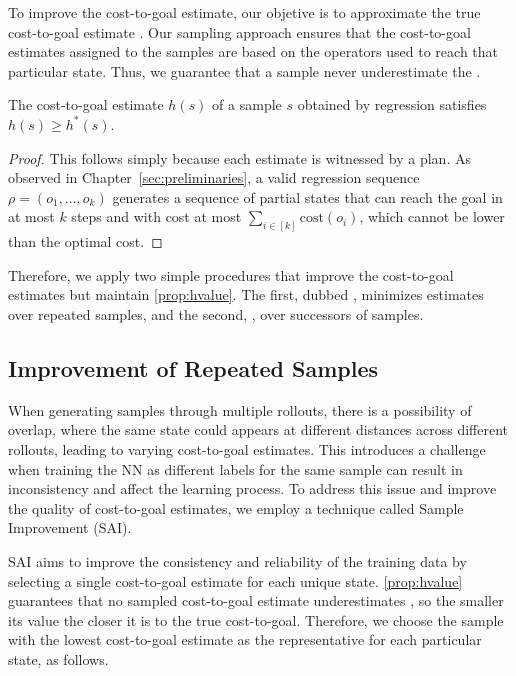 To improve the cost-to-goal estimate, our objetive is to approximate the true cost-to-goal estimate \hstar. Our sampling approach ensures that the cost-to-goal estimates assigned to the samples are based on the operators used to reach that particular state. Thus, we guarantee that a sample never underestimate the \hstar.

\begin{property}
    \label{prop:hvalue}
    The cost-to-goal estimate $h(s)$ of a sample $s$ obtained by regression satisfies $h(s)\geq h^*(s)$.
\end{property}
\begin{proof}
    This follows simply because each estimate is witnessed by a plan. As observed in Chapter~\ref{sec:preliminaries}, a valid regression sequence $\rho=(o_1,\ldots,o_k)$ generates a sequence of partial states that can reach the goal in at most $k$ steps and with cost at most $\sum_{i\in[k]}\text{cost}(o_i)$, which cannot be lower than the optimal cost.
\end{proof}

Therefore, we apply two simple procedures that improve the cost-to-goal estimates but maintain \cref{prop:hvalue}. The first, dubbed \hmin, minimizes estimates over repeated samples, and the second, \hvfc, over successors of samples.

\subsection{Improvement of Repeated Samples}
\label{sec:hmin} 

When generating samples through multiple rollouts, there is a possibility of overlap, where the same state could appears at different distances across different rollouts, leading to varying cost-to-goal estimates. This introduces a challenge when training the NN as different labels for the same sample can result in inconsistency and affect the learning process. To address this issue and improve the quality of cost-to-goal estimates, we employ a technique called Sample Improvement (SAI).

SAI aims to improve the consistency and reliability of the training data by selecting a single cost-to-goal estimate for each unique state. \cref{prop:hvalue} guarantees that no sampled cost-to-goal estimate underestimates \hstar, so the smaller its value the closer it is to the true cost-to-goal. Therefore, we choose the sample with the lowest cost-to-goal estimate as the representative for each particular state, as follows.

